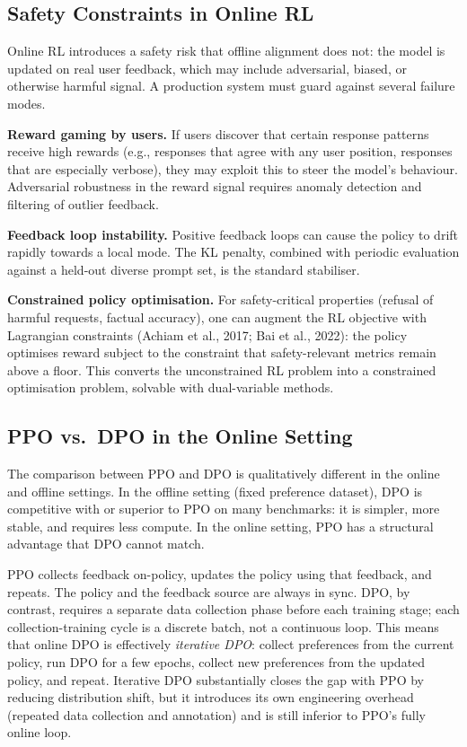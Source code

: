 \subsection{Safety Constraints in Online RL}

Online RL introduces a safety risk that offline alignment does not: the model is updated on real user feedback, which may include adversarial, biased, or otherwise harmful signal. A production system must guard against several failure modes.

\textbf{Reward gaming by users.} If users discover that certain response patterns receive high rewards (e.g., responses that agree with any user position, responses that are especially verbose), they may exploit this to steer the model's behaviour. Adversarial robustness in the reward signal requires anomaly detection and filtering of outlier feedback.

\textbf{Feedback loop instability.} Positive feedback loops can cause the policy to drift rapidly towards a local mode. The KL penalty, combined with periodic evaluation against a held-out diverse prompt set, is the standard stabiliser.

\textbf{Constrained policy optimisation.} For safety-critical properties (refusal of harmful requests, factual accuracy), one can augment the RL objective with Lagrangian constraints (Achiam et al., 2017; Bai et al., 2022): the policy optimises reward subject to the constraint that safety-relevant metrics remain above a floor. This converts the unconstrained RL problem into a constrained optimisation problem, solvable with dual-variable methods.

\subsection{PPO vs.\ DPO in the Online Setting}

The comparison between PPO and DPO is qualitatively different in the online and offline settings. In the offline setting (fixed preference dataset), DPO is competitive with or superior to PPO on many benchmarks: it is simpler, more stable, and requires less compute. In the online setting, PPO has a structural advantage that DPO cannot match.

PPO collects feedback on-policy, updates the policy using that feedback, and repeats. The policy and the feedback source are always in sync. DPO, by contrast, requires a separate data collection phase before each training stage; each collection-training cycle is a discrete batch, not a continuous loop. This means that online DPO is effectively \emph{iterative DPO}: collect preferences from the current policy, run DPO for a few epochs, collect new preferences from the updated policy, and repeat. Iterative DPO substantially closes the gap with PPO by reducing distribution shift, but it introduces its own engineering overhead (repeated data collection and annotation) and is still inferior to PPO's fully online loop.

